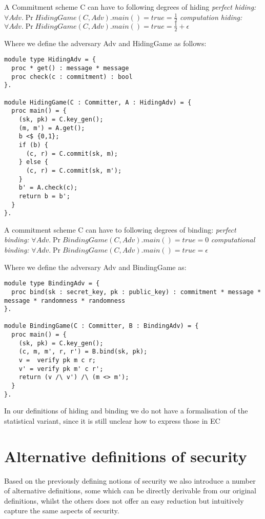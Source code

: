 \begin{definition}[Hiding]
  A Commitment scheme C can have to following degrees of hiding
  \label{def:commitment:hiding}
  \textit{perfect hiding:} $\forall Adv. \Pr{HidingGame(C,Adv).main() = true} = \frac{1}{2}$
  \textit{computation hiding:} $\forall Adv. \Pr{HidingGame(C,Adv).main() = true} = \frac{1}{2} + \epsilon$

  Where we define the adversary Adv and HidingGame as follows:
\begin{lstlisting}
module type HidingAdv = {
  proc * get() : message * message
  proc check(c : commitment) : bool
}.

module HidingGame(C : Committer, A : HidingAdv) = {
  proc main() = {
    (sk, pk) = C.key_gen();
    (m, m') = A.get();
    b <$ {0,1};
    if (b) {
      (c, r) = C.commit(sk, m);
    } else {
      (c, r) = C.commit(sk, m');
    }
    b' = A.check(c);
    return b = b';
  }
}.
\end{lstlisting}
\end{definition}

\begin{definition}[Binding]
  \label{def:commitment:binding}
  A commitment scheme C can have to following degrees of binding:
  \textit{perfect binding:} $\forall Adv. \Pr{BindingGame(C, Adv).main() = true} = 0$
  \textit{computational binding:} $\forall Adv. \Pr{BindingGame(C, Adv).main() = true} = \epsilon$

  Where we define the adversary Adv and BindingGame as:
\begin{lstlisting}
module type BindingAdv = {
  proc bind(sk : secret_key, pk : public_key) : commitment * message * message * randomness * randomness
}.

module BindingGame(C : Committer, B : BindingAdv) = {
  proc main() = {
    (sk, pk) = C.key_gen();
    (c, m, m', r, r') = B.bind(sk, pk);
    v =  verify pk m c r;
    v' = verify pk m' c r';
    return (v /\ v') /\ (m <> m');
  }
}.

\end{lstlisting}
\end{definition}

In our definitions of hiding and binding we do not have a formalisation of the statistical variant, since it is still unclear how to express those in EC 

\section{Alternative definitions of security}
\label{sec:commitment:alt-sec}
Based on the previously defining notions of security we also introduce a number
of alternative definitions, some which can be directly derivable from our
original definitions, whilst the others does not offer an easy reduction but
intuitively capture the same aspects of security.

